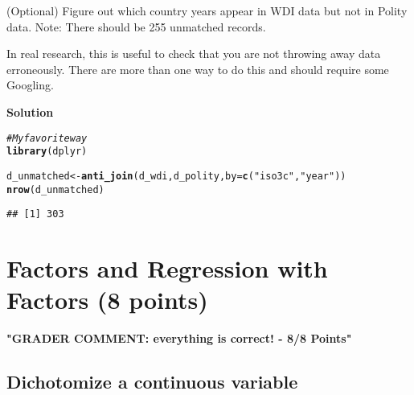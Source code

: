\documentclass{article}\usepackage[]{graphicx}\usepackage[]{color}
\makeatletter
\newcommand{\hlstr}[1]{\textcolor[rgb]{0.192,0.494,0.8}{#1}}%
\newcommand{\hlcom}[1]{\textcolor[rgb]{0.678,0.584,0.686}{\textit{#1}}}%
\newcommand{\hlstd}[1]{\textcolor[rgb]{0.345,0.345,0.345}{#1}}%
\newcommand{\hlkwb}[1]{\textcolor[rgb]{0.69,0.353,0.396}{#1}}%
\newcommand{\hlkwc}[1]{\textcolor[rgb]{0.333,0.667,0.333}{#1}}%
\newcommand{\hlkwd}[1]{\textcolor[rgb]{0.737,0.353,0.396}{\textbf{#1}}}%
\newenvironment{kframe}{%
 \def\at@end@of@kframe{}%
 \ifinner\ifhmode%
  \def\at@end@of@kframe{\end{minipage}}%
  \begin{minipage}{\columnwidth}%
 \fi\fi%
 \def\FrameCommand##1{\hskip\@totalleftmargin \hskip-\fboxsep
 \colorbox{shadecolor}{##1}\hskip-\fboxsep
     \hskip-\linewidth \hskip-\@totalleftmargin \hskip\columnwidth}%
 \MakeFramed {\advance\hsize-\width
   \@totalleftmargin\z@ \linewidth\hsize
   \@setminipage}}%
 {\par\unskip\endMakeFramed%
 \at@end@of@kframe}
\newenvironment{knitrout}{}{} %
\makeatother
\begin{document}
(Optional) Figure out which country years appear in WDI data but not in Polity data. Note: There should be 255 unmatched records.

In real research, this is useful to check that you are not throwing away data erroneously. There are more than one way to do this and should require some Googling.

\textbf{Solution}

\begin{knitrout}
\color{fgcolor}\begin{kframe}
\begin{alltt}
\hlcom{# My favorite way}
\hlkwd{library}\hlstd{(dplyr)}
\end{alltt}


{\ttfamily\noindent\itshape\color{messagecolor}{\#\# \\\#\# Attaching package: 'dplyr'}}

{\ttfamily\noindent\itshape\color{messagecolor}{\#\# The following objects are masked from 'package:stats':\\\#\# \\\#\#\ \ \ \  filter, lag}}

{\ttfamily\noindent\itshape\color{messagecolor}{\#\# The following objects are masked from 'package:base':\\\#\# \\\#\#\ \ \ \  intersect, setdiff, setequal, union}}\begin{alltt}
\hlstd{d_unmatched} \hlkwb{<-} \hlkwd{anti_join}\hlstd{(d_wdi, d_polity,} \hlkwc{by} \hlstd{=} \hlkwd{c}\hlstd{(}\hlstr{"iso3c"}\hlstd{,} \hlstr{"year"}\hlstd{))}
\hlkwd{nrow}\hlstd{(d_unmatched)}
\end{alltt}
\begin{verbatim}
## [1] 303
\end{verbatim}
\end{kframe}
\end{knitrout}

\section{Factors and Regression with Factors (8 points)}

\textbf{\color{red} "GRADER COMMENT: everything is correct! - 8/8 Points"}

\subsection{Dichotomize a continuous variable}
\end{document}
